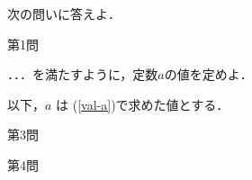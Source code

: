 次の問いに答えよ．
\begin{Enumerate}
	\item 第1問
	\item{\label{val-a}} ．．．を満たすように，定数$a$の値を定めよ．
\end{Enumerate}
以下，$a$ は (\ref{val-a})で求めた値とする．
\begin{Enumerate*}
	\item 第3問
	\item 第4問
\end{Enumerate*}
